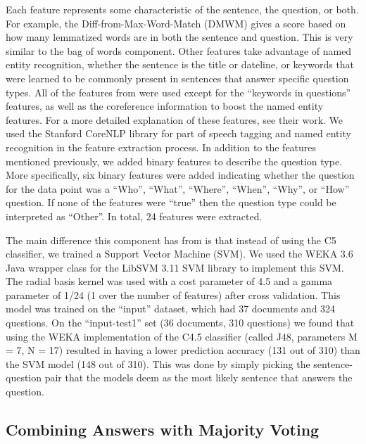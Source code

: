 \documentclass[11pt,letterpaper]{article}
\begin{document}
Each feature represents some characteristic of the sentence, the
question, or both.  For example, the Diff-from-Max-Word-Match (DMWM)
gives a score based on how many lemmatized words are in both the
sentence and question.  This is very similar to the bag of words
component.  Other features take advantage of named entity recognition,
whether the sentence is the title or dateline, or keywords that were
learned to be commonly present in sentences that answer specific
question types.  All of the features from \cite{Ng00amachine} were
used except for the ``keywords in questions'' features, as well as the
coreference information to boost the named entity features.  For a
more detailed explanation of these features, see their work.  We used
the Stanford CoreNLP library for part of speech tagging
\cite{Toutanova00enrichingthe} and named entity recognition
\cite{Finkel05incorporatingnon-local} in the feature extraction
process.  In addition to the features mentioned previously, we added
binary features to describe the question type.  More specifically, six
binary features were added indicating whether the question for the
data point was a ``Who'', ``What'', ``Where'', ``When'', ``Why'', or
``How'' question.  If none of the features were ``true'' then the
question type could be interpreted as ``Other''.   In total, 24
features were extracted.

The main difference this component has from \cite{Ng00amachine} is
that instead of using the C5 classifier, we trained a Support Vector
Machine (SVM).  We used the WEKA 3.6 \cite{Hall_theweka} Java wrapper
class for the LibSVM 3.11 \cite{Chang01libsvm:a} SVM library to
implement this SVM.  The radial basis kernel was used with a cost
parameter of 4.5 and a gamma parameter of 1/24 (1 over the number of
features) after cross validation.   This model was trained on the
``input'' dataset, which had 37 documents and 324 questions.  On the
``input-test1'' set (36 documents, 310 questions) we found that using
the WEKA implementation of the C4.5 classifier (called J48,
parameters M = 7, N = 17) resulted in having a lower prediction
accuracy (131 out of 310) than the SVM model (148 out of 310).  This was
done by simply picking the sentence-question pair that the models deem as
the most likely sentence that answers the question. 


\subsection{Combining Answers with Majority Voting}
\end{document}
